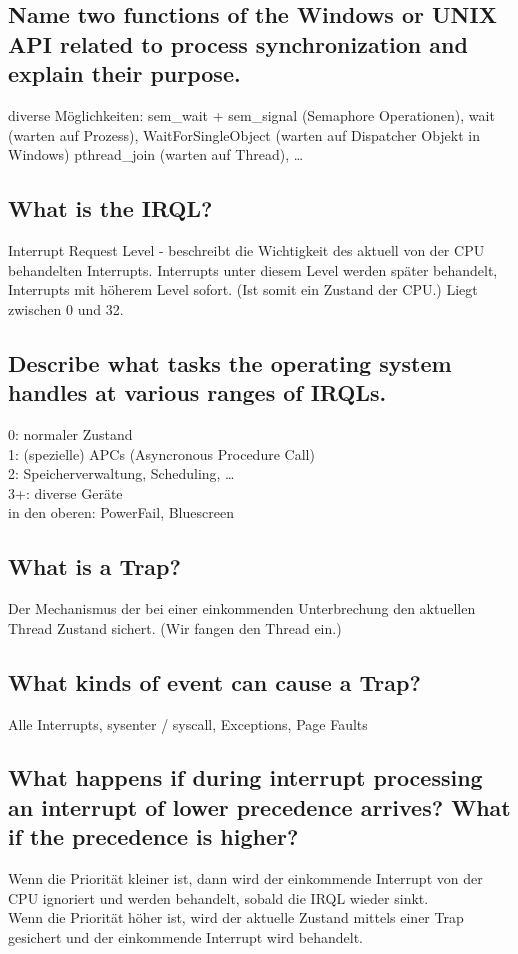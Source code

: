 \subsection{Name two functions of the Windows or UNIX API related to process synchronization and explain their purpose.}
diverse Möglichkeiten: sem\_wait + sem\_signal (Semaphore Operationen), wait (warten auf Prozess), WaitForSingleObject (warten auf Dispatcher Objekt in Windows) pthread\_join (warten auf Thread), \dots

\subsection{\important What is the IRQL?}
Interrupt Request Level - beschreibt die Wichtigkeit des aktuell von der CPU behandelten Interrupts.
Interrupts unter diesem Level werden später behandelt, Interrupts mit höherem Level sofort.
(Ist somit ein Zustand der CPU.)
Liegt zwischen 0 und 32.

\subsection{Describe what tasks the operating system handles at various ranges of IRQLs.}
0: normaler Zustand\\
1: (spezielle) APCs (Asyncronous Procedure Call)\\
2: Speicherverwaltung, Scheduling, \dots\\
3+: diverse Geräte\\
in den oberen: PowerFail, Bluescreen

\subsection{What is a Trap?}
Der Mechanismus der bei einer einkommenden Unterbrechung den aktuellen Thread Zustand sichert.
(Wir fangen den Thread ein.)

\subsection{What kinds of event can cause a Trap?}
Alle Interrupts, sysenter / syscall, Exceptions, Page Faults

\subsection{What happens if during interrupt processing an interrupt of lower precedence arrives? What if the precedence is higher?}
Wenn die Priorität kleiner ist, dann wird der einkommende Interrupt von der CPU ignoriert und werden behandelt, sobald die IRQL wieder sinkt.\\
Wenn die Priorität höher ist, wird der aktuelle Zustand mittels einer Trap gesichert und der einkommende Interrupt wird behandelt.

